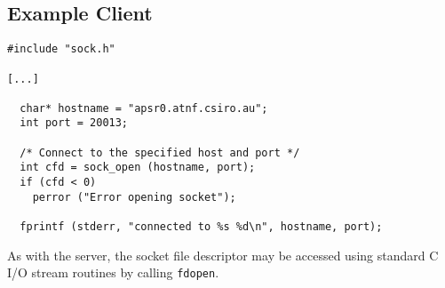 \subsection{Example Client}

\begin{verbatim}
#include "sock.h"

[...]

  char* hostname = "apsr0.atnf.csiro.au";
  int port = 20013;

  /* Connect to the specified host and port */
  int cfd = sock_open (hostname, port);
  if (cfd < 0)
    perror ("Error opening socket");

  fprintf (stderr, "connected to %s %d\n", hostname, port);
\end{verbatim}
As with the server, the socket file descriptor may be accessed using
standard C I/O stream routines by calling {\tt fdopen}.
